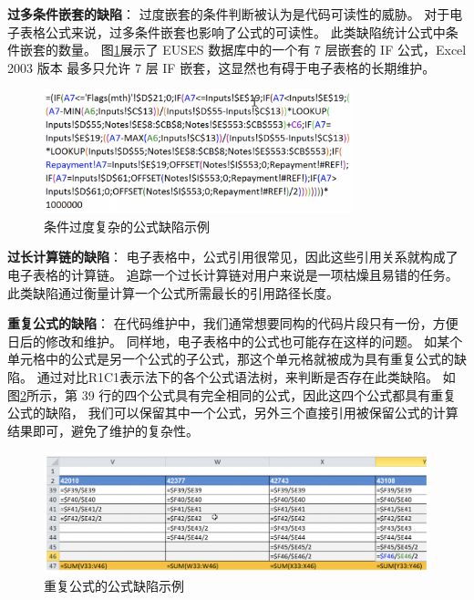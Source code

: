 \textbf{过多条件嵌套的缺陷}：
过度嵌套的条件判断被认为是代码可读性的威胁\cite{fowler1997refactoring}。
对于电子表格公式来说，过多条件嵌套也影响了公式的可读性。
此类缺陷统计公式中条件嵌套的数量。
图\ref{figure-ConditionalComplexity}展示了 EUSES 数据库中的一个有 7 层嵌套的 IF 公式，Excel 2003 版本 最多只允许 7 层 IF 嵌套，这显然也有碍于电子表格的长期维护。

\begin{figure}[tbp]    
    \centering
    \includegraphics[width=0.8\textwidth]{figure/relatedwork/ConditionalComplexity.png}
    \caption{条件过度复杂的公式缺陷示例}
    \label{figure-ConditionalComplexity}
\end{figure}

\textbf{过长计算链的缺陷}：
电子表格中，公式引用很常见，因此这些引用关系就构成了电子表格的计算链。
追踪一个过长计算链对用户来说是一项枯燥且易错的任务。
此类缺陷通过衡量计算一个公式所需最长的引用路径长度。

\textbf{重复公式的缺陷}：
在代码维护中，我们通常想要同构的代码片段只有一份，方便日后的修改和维护。
同样地，电子表格中的公式也可能存在这样的问题。
如某个单元格中的公式是另一个公式的子公式，那这个单元格就被成为具有重复公式的缺陷。
通过对比R1C1表示法下的各个公式语法树，来判断是否存在此类缺陷。
如图\ref{figure-DuplicatedFormula}所示，第 39 行的四个公式具有完全相同的公式，因此这四个公式都具有重复公式的缺陷，
我们可以保留其中一个公式，另外三个直接引用被保留公式的计算结果即可，避免了维护的复杂性。

\begin{figure}[tbp]    
    \centering
    \includegraphics[width=\textwidth]{figure/relatedwork/DuplicatedFormula.png}
    \caption{重复公式的公式缺陷示例}
    \label{figure-DuplicatedFormula}
\end{figure}

